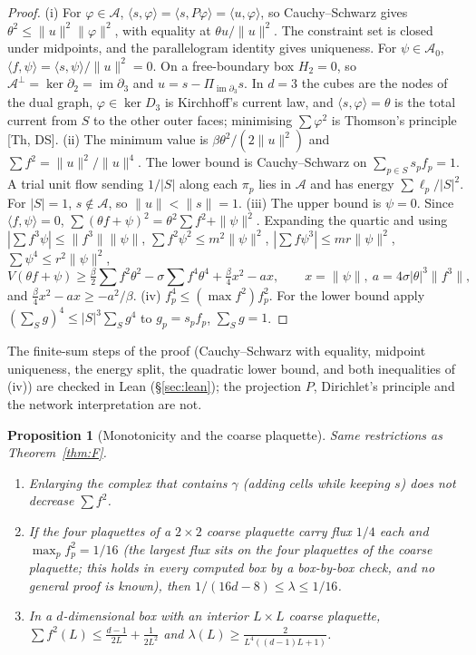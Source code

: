 \documentclass[11pt,a4paper]{article}
\newtheorem{proposition}[theorem]{Proposition}
\theoremstyle{definition}
\theoremstyle{remark}
\newcommand{\cA}{\mathcal{A}}
\newcommand{\im}{\operatorname{im}}
\begin{document}
\begin{proof}
(i) For $\varphi\in\cA$, $\langle s,\varphi\rangle=\langle s,P\varphi\rangle=\langle u,\varphi\rangle$, so Cauchy--Schwarz gives $\theta^2\le\|u\|^2\|\varphi\|^2$, with equality at $\theta u/\|u\|^2$. The constraint set is closed under midpoints, and the parallelogram identity gives uniqueness. For $\psi\in\cA_0$, $\langle f,\psi\rangle=\langle s,\psi\rangle/\|u\|^2=0$. On a free-boundary box $H_2=0$, so $\cA^\perp=\ker\partial_2=\im\partial_3$ and $u=s-\Pi_{\im\partial_3}s$. In $d=3$ the cubes are the nodes of the dual graph, $\varphi\in\ker D_3$ is Kirchhoff's current law, and $\langle s,\varphi\rangle=\theta$ is the total current from $S$ to the other outer faces; minimising $\sum\varphi^2$ is Thomson's principle [Th, DS].
(ii) The minimum value is $\beta\theta^2/(2\|u\|^2)$ and $\sum f^2=\|u\|^2/\|u\|^4$. The lower bound is Cauchy--Schwarz on $\sum_{p\in S}s_pf_p=1$. A trial unit flow sending $1/|S|$ along each $\pi_p$ lies in $\cA$ and has energy $\sum\ell_p/|S|^2$. For $|S|=1$, $s\notin\cA$, so $\|u\|<\|s\|=1$.
(iii) The upper bound is $\psi=0$. Since $\langle f,\psi\rangle=0$, $\sum(\theta f+\psi)^2=\theta^2\sum f^2+\|\psi\|^2$. Expanding the quartic and using $|\sum f^3\psi|\le\|f^3\|\|\psi\|$, $\sum f^2\psi^2\le m^2\|\psi\|^2$, $|\sum f\psi^3|\le mr\|\psi\|^2$, $\sum\psi^4\le r^2\|\psi\|^2$,
\[V(\theta f+\psi)\ge\tfrac\beta2{\textstyle\sum} f^2\theta^2-\sigma{\textstyle\sum} f^4\theta^4+\tfrac\beta4x^2-ax,\qquad x=\|\psi\|,\ a=4\sigma|\theta|^3\|f^3\|,\]
and $\frac\beta4x^2-ax\ge-a^2/\beta$.
(iv) $f_p^4\le(\max f^2)f_p^2$. For the lower bound apply $(\sum_Sg)^4\le|S|^3\sum_Sg^4$ to $g_p=s_pf_p$, $\sum_Sg=1$.
\end{proof}

The finite-sum steps of the proof (Cauchy--Schwarz with equality, midpoint uniqueness, the energy split, the quadratic lower bound, and both inequalities of (iv)) are checked in Lean (\S\ref{sec:lean}); the projection $P$, Dirichlet's principle and the network interpretation are not.

\begin{proposition}[Monotonicity and the coarse plaquette]\label{prop:ineq}
Same restrictions as Theorem~\ref{thm:F}.
\begin{enumerate}[label=(\alph*)]
\item Enlarging the complex that contains $\gamma$ (adding cells while keeping $s$) does not decrease $\sum f^2$.
\item If the four plaquettes of a $2\times2$ coarse plaquette carry flux $1/4$ each and $\max_pf_p^2=1/16$ (the largest flux sits on the four plaquettes of the coarse plaquette; this holds in every computed box by a box-by-box check, and no general proof is known), then $1/(16d-8)\le\lambda\le1/16$.
\item In a $d$-dimensional box with an interior $L\times L$ coarse plaquette, $\sum f^2(L)\le\frac{d-1}{2L}+\frac{1}{2L^2}$ and $\lambda(L)\ge\frac{2}{L^4((d-1)L+1)}$.
\end{enumerate}
\end{proposition}
\end{document}
